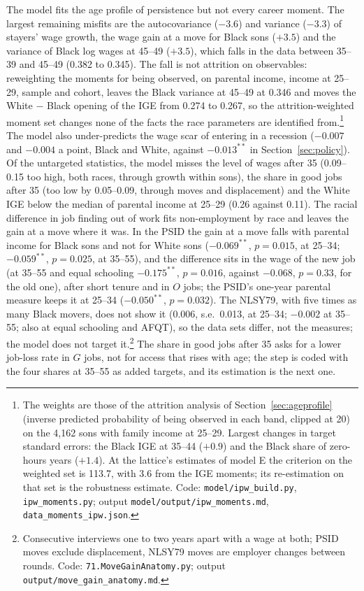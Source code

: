 The model fits the age profile of persistence but not every career moment. The largest remaining misfits are the autocovariance
($-3.6$) and variance ($-3.3$) of stayers' wage growth, the wage gain at a move for Black sons ($+3.5$) and the variance
of Black log wages at 45--49 ($+3.5$), which falls in the data between 35--39 and 45--49 (0.382 to 0.345). The fall is not attrition on
observables: reweighting the moments for being observed, on parental income, income at 25--29, sample and cohort,
leaves the Black variance at 45--49 at 0.346 and moves the White $-$ Black opening of the IGE from 0.274 to 0.267, so the
attrition-weighted moment set changes none of the facts the race parameters are identified from.\footnote{The weights
are those of the attrition analysis of Section~\ref{sec:ageprofile} (inverse predicted probability of being observed in
each band, clipped at 20) on the 4,162 sons with family income at 25--29. Largest changes in target standard errors: the
Black IGE at 35--44 ($+0.9$) and the Black share of zero-hours years ($+1.4$). At the lattice's estimates of model E the criterion
on the weighted set is 113.7, with 3.6 from the IGE moments; its re-estimation on that set is the robustness
estimate. Code: \texttt{model/ipw\_build.py}, \texttt{ipw\_moments.py}; output
\texttt{model/output/ipw\_moments.md}, \texttt{data\_moments\_ipw.json}.} The
model also under-predicts the wage scar of entering in a recession ($-0.007$ and $-0.004$ a point, Black and White,
against $-0.013^{**}$ in Section~\ref{sec:policy}). Of the untargeted statistics, the model misses the level of wages after 35 (0.09--0.15 too high,
both races, through growth within sons), the share in good jobs after 35 (too low by 0.05--0.09, through moves and
displacement) and the White IGE below the median of parental income at 25--29 (0.26 against 0.11). The racial difference in job finding out of work fits non-employment by race and leaves the gain at a move where it
was. In the PSID the gain at a move falls with parental income for Black sons and not for White sons ($-0.069^{**}$,
$p = 0.015$, at 25--34; $-0.059^{**}$, $p = 0.025$, at 35--55), and the difference sits in the wage of the new job
(at 35--55 and equal schooling $-0.175^{**}$, $p = 0.016$, against $-0.068$, $p = 0.33$, for the old one), after short
tenure and in $O$ jobs; the PSID's one-year parental measure keeps it at 25--34 ($-0.050^{**}$, $p = 0.032$). The
NLSY79, with five times as many Black movers, does not show it (0.006, s.e.\ 0.013, at 25--34; $-0.002$ at 35--55;
also at equal schooling and AFQT), so the data sets differ, not the measures; the model does not target
it.\footnote{Consecutive interviews one to two years apart with a wage at both; PSID moves exclude displacement,
NLSY79 moves are employer changes between rounds. Code: \texttt{71.MoveGainAnatomy.py}; output
\texttt{output/move\_gain\_anatomy.md}.} The share in good jobs after 35 asks for a
lower job-loss rate in $G$ jobs, not for access that rises with age; the step is coded with the four shares at 35--55 as
added targets, and its estimation is the next one.

